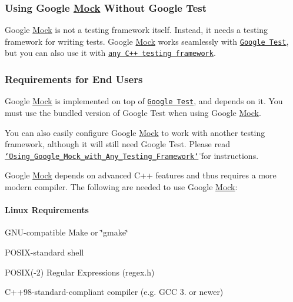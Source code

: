 \subsubsection*{Using Google \hyperlink{classMock}{Mock} Without Google Test}

Google \hyperlink{classMock}{Mock} is not a testing framework itself. Instead, it needs a testing framework for writing tests. Google \hyperlink{classMock}{Mock} works seamlessly with \href{https://github.com/google/googletest}{\tt Google Test}, but you can also use it with \href{../googlemock/docs/ForDummies.md#using-google-mock-with-any-testing-framework}{\tt any C++ testing framework}.

\subsubsection*{Requirements for End Users}

Google \hyperlink{classMock}{Mock} is implemented on top of \href{http://github.com/google/googletest/}{\tt Google Test}, and depends on it. You must use the bundled version of Google Test when using Google \hyperlink{classMock}{Mock}.

You can also easily configure Google \hyperlink{classMock}{Mock} to work with another testing framework, although it will still need Google Test. Please read \href{../googlemock/docs/ForDummies.md#using-google-mock-with-any-testing-framework}{\tt \char`\"{}\+Using\+\_\+\+Google\+\_\+\+Mock\+\_\+with\+\_\+\+Any\+\_\+\+Testing\+\_\+\+Framework\char`\"{}} for instructions.

Google \hyperlink{classMock}{Mock} depends on advanced C++ features and thus requires a more modern compiler. The following are needed to use Google \hyperlink{classMock}{Mock}\+:

\paragraph*{Linux Requirements}


\begin{DoxyItemize}
\item G\+N\+U-\/compatible Make or \char`\"{}gmake\char`\"{}
\item P\+O\+S\+I\+X-\/standard shell
\item P\+O\+S\+IX(-\/2) Regular Expressions (regex.\+h)
\item C++98-\/standard-\/compliant compiler (e.\+g. G\+CC 3. or newer)
\end{DoxyItemize}

